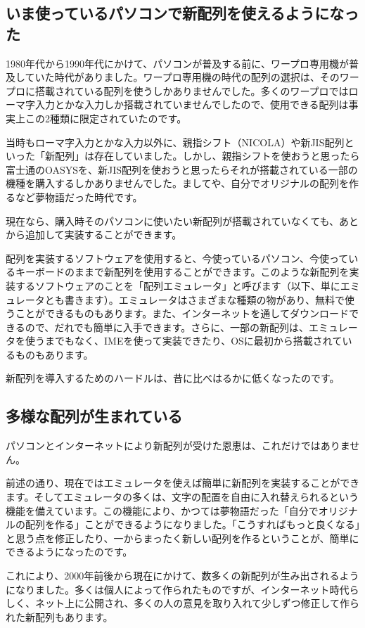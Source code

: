 \subsection{いま使っているパソコンで新配列を使えるようになった}

1980年代から1990年代にかけて、パソコンが普及する前に、ワープロ専用機が普及していた時代がありました。ワープロ専用機の時代の配列の選択は、そのワープロに搭載されている配列を使うしかありませんでした。多くのワープロではローマ字入力とかな入力しか搭載されていませんでしたので、使用できる配列は事実上この2種類に限定されていたのです。

当時もローマ字入力とかな入力以外に、親指シフト（NICOLA）や新JIS配列といった「新配列」は存在していました。しかし、親指シフトを使おうと思ったら富士通のOASYSを、新JIS配列を使おうと思ったらそれが搭載されている一部の機種を購入するしかありませんでした。ましてや、自分でオリジナルの配列を作るなど夢物語だった時代です。

現在なら、購入時そのパソコンに使いたい新配列が搭載されていなくても、あとから追加して実装することができます。

配列を実装するソフトウェアを使用すると、今使っているパソコン、今使っているキーボードのままで新配列を使用することができます。このような新配列を実装するソフトウェアのことを「配列エミュレータ」と呼びます（以下、単にエミュレータとも書きます）。エミュレータはさまざまな種類の物があり、無料で使うことができるものもあります。また、インターネットを通してダウンロードできるので、だれでも簡単に入手できます。さらに、一部の新配列は、エミュレータを使うまでもなく、IMEを使って実装できたり、OSに最初から搭載されているものもあります。

新配列を導入するためのハードルは、昔に比べはるかに低くなったのです。

\subsection{多様な配列が生まれている}

パソコンとインターネットにより新配列が受けた恩恵は、これだけではありません。

前述の通り、現在ではエミュレータを使えば簡単に新配列を実装することができます。そしてエミュレータの多くは、文字の配置を自由に入れ替えられるという機能を備えています。この機能により、かつては夢物語だった「自分でオリジナルの配列を作る」ことができるようになりました。「こうすればもっと良くなる」と思う点を修正したり、一からまったく新しい配列を作るということが、簡単にできるようになったのです。

これにより、2000年前後から現在にかけて、数多くの新配列が生み出されるようになりました。多くは個人によって作られたものですが、インターネット時代らしく、ネット上に公開され、多くの人の意見を取り入れて少しずつ修正して作られた新配列もあります。

